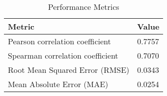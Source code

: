 \documentclass{article}
\begin{document}
\begin{table}[h!]
\centering
\begin{tabular}{ll}
\toprule
Metric & Value \\
\midrule
Pearson correlation coefficient & 0.7757 \\
Spearman correlation coefficient & 0.7070 \\
Root Mean Squared Error (RMSE) & 0.0343 \\
Mean Absolute Error (MAE) & 0.0254 \\
\bottomrule
\end{tabular}
\caption{Performance Metrics}
\label{tab:metrics}
\end{table}
\end{document}
